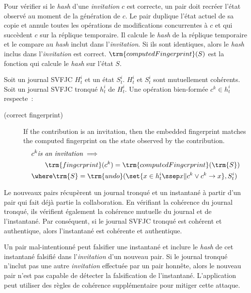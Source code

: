 Pour vérifier  si le \emph{hash} d'une \emph{invitation} $c$ est correcte, un pair doit recréer l'état observé au moment de la génération de $c$.
Le pair duplique l'état actuel de sa copie et annule toutes les opérations de modifications concurrentes à $c$ et qui succèdent $c$ sur la réplique temporaire.
Il calcule le \emph{hash} de la réplique temporaire et le compare au \emph{hash} inclut dans l'\emph{invitation}.
Si ils sont identiques, alors le \emph{hash} inclus dans l'\emph{invitation} est correct.
$\trm{computedFingerprint}(S)$ est la fonction qui calcule le \emph{hash} sur l'état $S$.

\begin{definition}\label{def:wfc-f}
Soit un journal \ac{SVFJC} $H^i_t$ et un état $S^i_t$.
$H^i_t$ et $S^i_t$ sont mutuellement cohérents.
Soit un journal \ac{SVFJC} tronqué $h^i_t$ de $H^i_t$.
Une opération bien-formée $c^k \in h^i_t$ respecte~:
\begin{description}
    \item[ (correct fingerprint)]
    If the contribution is an invitation, then the embedded fingerprint matches the computed fingerprint on the state observed by the contribution.
    \begin{align*}
    &c^k \textit{is an invitation} \implies\\
    &\qquad\trm{fingerprint}(c^k) = \trm{computedFingerprint}(\trm{S})\\
    &\where\trm{S} = \trm{undo}(\set{x \in h^i_t \ssep x \| c^k \lor c^k \to x}, S^i_t)
    \end{align*}
\end{description}
\end{definition}

Le nouveaux pairs récupèrent un journal tronqué et un instantané à partir d'un pair qui fait déjà partie la collaboration.
En vérifiant la cohérence du journal tronqué, ils vérifient également la cohérence mutuelle du journal et de l'instantané.
Par conséquent, si le journal \ac{SVFJC} tronqué est cohérent et authentique, alors l'instantané est cohérente et authentique.

Un pair mal-intentionné peut falsifier une instantané et inclure le \emph{hash} de cet instantané falsifié dans l'\emph{invitation} d'un nouveau pair.
Si le journal tronqué n'inclut pas une autre \emph{invitation} effectuée par un pair honnête, alors le nouveau pair n'est pas capable de détecter la falsification de l'instantané.
L'application peut utiliser des règles de cohérence supplémentaire pour mitiger cette attaque.

